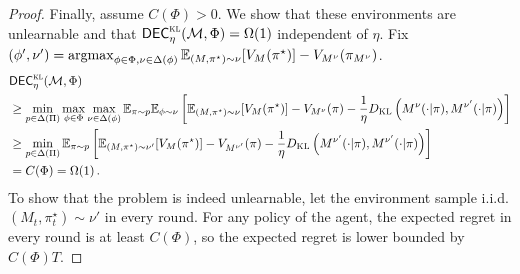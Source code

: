 \begin{proof}
Finally, assume $C(\Phi)>0$. We show that these environments are unlearnable and that $\mathsf{DEC}^{\textsc{kl}}_\eta(\mathcal{M},\Phi)=\Omega(1)$ independent of $\eta$.
Fix $(\phi', \nu') = \operatorname*{argmax}_{\phi\in\Phi,\nu\in\Delta(\phi)}\mathbb{E}_{(M,\pi^\star)\sim\nu}[V_M(\pi^\star)]-V_{M^\nu}(\pi_{M^\nu})$.
\begin{align*}
    &\mathsf{DEC}^{\textsc{kl}}_\eta(\mathcal{M},\Phi)\\
    &\geq \min_{p\in\Delta(\Pi)}\max_{\phi\in\Phi} \max_{\nu\in \Delta(\phi)}   \mathbb{E}_{\pi\sim p} \mathbb{E}_{\phi\sim \nu}   \left[\mathbb{E}_{(M,\pi^\star)\sim \nu}[V_{M}(\pi^\star)] - V_{M^\nu}(\pi) - \frac{1}{\eta}  D_{\textsc{KL}}\left( M^{\nu}(\cdot|\pi), M^{\nu'}(\cdot|\pi) \right)\right]\\
    &\geq \min_{p\in\Delta(\Pi)}\mathbb{E}_{\pi\sim p} \left[\mathbb{E}_{(M,\pi^\star)\sim \nu'}[V_{M}(\pi^\star)] - V_{M^{\nu'}}(\pi) - \frac{1}{\eta}  D_{\textsc{KL}}\left( M^{\nu'}(\cdot|\pi), M^{\nu'}(\cdot|\pi) \right)\right]\\
    &=C(\Phi)=\Omega(1)\,.
\end{align*}
To show that the problem is indeed unlearnable, let the environment sample i.i.d. $(M_t,\pi^\star_t)\sim\nu'$ in every round. For any policy of the agent, the expected regret in every round is at least $C(\Phi)$, so the expected regret is lower bounded by $C(\Phi)T$.

\iffalse
Now we continue to prove $\dec^{\textsc{KL}}_\eta (\calM, \Phi) \leq \dec^{\textsc{KL}}_\eta(\bar\calM(\Phi))$.

By the definition of $\dec^{\textsc{KL}}_\eta(\bar\calM(\Phi))$, we have for any $\bar M\in \co(\calM)$ that there exists $p\in\Delta(\Pi)$ such that for all $\phi\in\Phi$ and all $q\in\co(\phi)$, we have
\begin{align*}
    \E_{\pi\sim p}\left[\max_{\pi'}V_{q}(\pi')-V_{q}(\pi)-\frac{1}{\eta}\KL(M^{q}(\pi), \bar M(\pi))\right] \leq \dec^{\textsc{KL}}_{\eta}(\bar\calM(\Phi))
\end{align*}
setting $q^{\phi}=\nu_{\cdot|\phi}$ and taking the expectation over $(\phi)\sim \nu$ leads to
\begin{align*}
&\dec_{\eta}^{\textsc{KL}}\left(\calM, \Phi\right) = 
\\&\max_{\Bar{M} \in \textsc{co}(\calM)}\min_{p\in\Delta(\Pi)} \max_{\nu\in \Delta(\Psi)}   \E_{\pi\sim p} \E_{\phi\sim \nu}  \E_{(M,\pi^\star)\sim \nu(\cdot|\phi)} \left[V_{M}(\pi^\star) - V_{M}(\pi) - \frac{1}{\eta}  \KL\left( M^{\nu(\cdot|\phi)}(\cdot|\pi), \Bar{M}(\cdot|\pi) \right)\right]\\
&\leq \max_{\Bar{M} \in \textsc{co}(\calM)}\min_{p\in\Delta(\Pi)} \max_{\nu\in \Delta(\Psi)}   \E_{\pi\sim p} \E_{\phi\sim \nu}\dec_{\eta}^{\textsc{KL}}(\bar\calM(\Phi))=\dec_{\eta}^{\textsc{KL}}(\bar\calM(\Phi))
\end{align*}
\fi
\end{proof}
